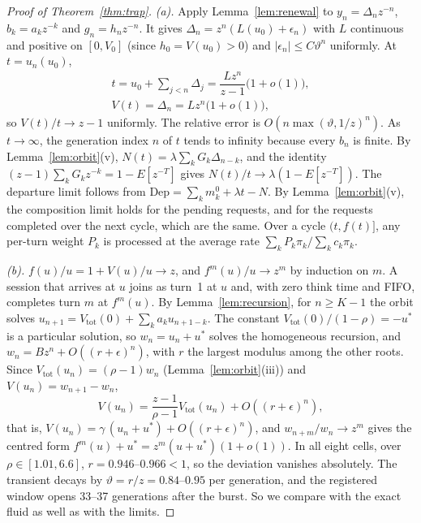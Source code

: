 \begin{proof}[Proof of Theorem~\ref{thm:trap}]
\emph{(a).} Apply Lemma~\ref{lem:renewal} to $y_n=\Delta_nz^{-n}$, $b_k=a_kz^{-k}$ and $g_n=h_nz^{-n}$. It gives
$\Delta_n=z^n(L(u_0)+\epsilon_n)$ with $L$ continuous and positive on $[0,V_0]$ (since $h_0=V(u_0)>0$) and
$|\epsilon_n|\le C\vartheta^n$ uniformly. At $t=u_n(u_0)$,
\begin{gather*}
t=u_0+\textstyle\sum_{j<n}\Delta_j=\dfrac{Lz^n}{z-1}\bigl(1+o(1)\bigr),\\
V(t)=\Delta_n=Lz^n\bigl(1+o(1)\bigr),
\end{gather*}
so $V(t)/t\to z-1$ uniformly. The relative error is $O(n\max(\vartheta,1/z)^n)$. As $t\to\infty$, the generation index $n$
of $t$ tends to infinity because every $b_n$ is finite. By Lemma~\ref{lem:orbit}(v), $N(t)=\lambda\sum_kG_k\Delta_{n-k}$, and the
identity $(z-1)\sum_kG_kz^{-k}=1-E[z^{-T}]$ gives $N(t)/t\to\lambda(1-E[z^{-T}])$. The departure limit follows from
$\mathrm{Dep}=\sum_km_k^0+\lambda t-N$. By Lemma~\ref{lem:orbit}(v), the composition limit holds for the pending requests, and for
the requests completed over the next cycle, which are the same. Over a cycle $(t,f(t)]$, any per-turn weight $P_k$ is processed at
the average rate $\sum_kP_k\pi_k/\sum_kc_k\pi_k$.

\emph{(b).} $f(u)/u=1+V(u)/u\to z$, and $f^m(u)/u\to z^m$ by induction on $m$. A session that arrives at $u$ joins as turn~1 at
$u$ and, with zero think time and FIFO, completes turn $m$ at $f^m(u)$. By Lemma~\ref{lem:recursion}, for $n\ge K-1$ the orbit
solves $u_{n+1}=V_{\mathrm{tot}}(0)+\sum_ka_ku_{n+1-k}$. The constant $V_{\mathrm{tot}}(0)/(1-\rho)=-u^*$ is a particular solution,
so $w_n=u_n+u^*$ solves the homogeneous recursion, and $w_n=Bz^n+O((r+\epsilon)^n)$, with $r$ the largest modulus among the other
roots. Since $V_{\mathrm{tot}}(u_n)=(\rho-1)w_n$ (Lemma~\ref{lem:orbit}(iii)) and $V(u_n)=w_{n+1}-w_n$,
\[
V(u_n)=\frac{z-1}{\rho-1}V_{\mathrm{tot}}(u_n)+O((r+\epsilon)^n),
\]
that is, $V(u_n)=\gamma\,(u_n+u^*)+O((r+\epsilon)^n)$, and $w_{n+m}/w_n\to z^m$ gives the centred form
$f^m(u)+u^*=z^m(u+u^*)(1+o(1))$. In all eight cells, over $\rho\in[1.01,6.6]$, $r=0.946$--$0.966<1$, so the deviation vanishes
absolutely. The transient decays by $\vartheta=r/z=0.84$--$0.95$ per generation, and the registered window opens 33--37 generations
after the burst. So we compare with the exact fluid as well as with the limits.
\end{proof}

